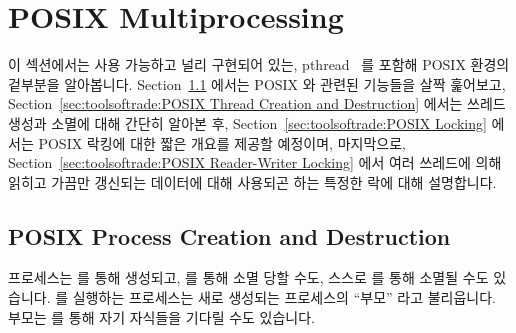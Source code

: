\section{POSIX Multiprocessing}
\label{sec:toolsoftrade:POSIX Multiprocessing}

이 섹션에서는 사용 가능하고 널리 구현되어 있는,
pthread~\cite{OpenGroup1997pthreads} 를 포함해 POSIX 환경의 겉부분을
알아봅니다.
Section~\ref{sec:toolsoftrade:POSIX Process Creation and Destruction}
에서는 POSIX  와 관련된 기능들을 살짝 훑어보고,
Section~\ref{sec:toolsoftrade:POSIX Thread Creation and Destruction}
에서는 쓰레드 생성과 소멸에 대해 간단히 알아본 후,
Section~\ref{sec:toolsoftrade:POSIX Locking} 에서는 POSIX 락킹에 대한 짧은
개요를 제공할 예정이며, 마지막으로,
Section~\ref{sec:toolsoftrade:POSIX Reader-Writer Locking} 에서 여러 쓰레드에
의해 읽히고 가끔만 갱신되는 데이터에 대해 사용되곤 하는 특정한 락에 대해
설명합니다.

\subsection{POSIX Process Creation and Destruction}
\label{sec:toolsoftrade:POSIX Process Creation and Destruction}

프로세스는  를 통해 생성되고,  를 통해 소멸 당할 수도,
스스로  를 통해 소멸될 수도 있습니다.
 를 실행하는 프로세스는 새로 생성되는 프로세스의 ``부모'' 라고
불리웁니다.
부모는  를 통해 자기 자식들을 기다릴 수도 있습니다.

